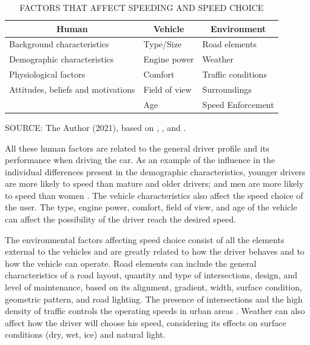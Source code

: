 \begin{table}[!hbtp]
    \footnotesize
    \captionsetup{justification=raggedright,
        singlelinecheck=false,
        font=footnotesize}
    \caption{FACTORS THAT AFFECT SPEEDING AND SPEED CHOICE}
    \centering
    \begin{tabular}{lll}
    \hline
    \multicolumn{1}{c}{\textbf{Human}}                  & \multicolumn{1}{c}{\textbf{Vehicle}} & \multicolumn{1}{c}{\textbf{Environment}} \\ \hline
    Background characteristics      & Type/Size        & Road elements        \\
    Demographic characteristics     & Engine power     & Weather              \\
    Physiological factors           & Comfort          & Traffic conditions   \\
    Attitudes, beliefs and motivations & Field of view    & Surroundings    \\
                                    & Age              & Speed Enforcement    \\ \hline
\end{tabular}
    \label{tab:spdfct}
    \par \vspace{2mm} \footnotesize \raggedright
    SOURCE: The Author (2021), based on \textcite{Richard2013a}, \textcite{Shinar2017}, and \textcite{WHO2008}.
\end{table}

All these human factors are related to the general driver profile and its performance when driving the car. As an example of the influence in the individual differences present in the demographic characteristics, younger drivers are more likely to speed than mature and older drivers; and men are more likely to speed than women \cite{Shinar2017}. The vehicle characteristics also affect the speed choice of the user. The type, engine power, comfort, field of view, and age of the vehicle can affect the possibility of the driver reach the desired speed. 

The environmental factors affecting speed choice consist of all the elements external to the vehicles and are greatly related to how the driver behaves and to how the vehicle can operate. Road elements can include the general characteristics of a road layout, quantity and type of intersections, design, and level of maintenance, based on its alignment, gradient, width, surface condition, geometric pattern, and road lighting. The presence of intersections and the high density of traffic controls the operating speeds in urban areas \cite{Mohan2016a}. Weather can also affect how the driver will choose his speed, considering its effects on surface conditions (dry, wet, ice) and natural light.  

